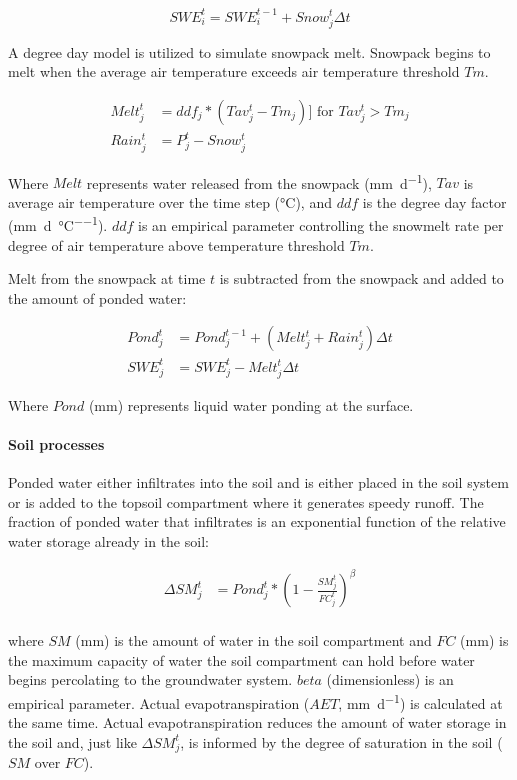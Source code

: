 \begin{equation}
SWE_i^t = SWE_i^{t-1} + Snow_j^t \Delta t
\end{equation}

A degree day model is utilized to simulate snowpack melt. Snowpack begins to melt when the average air temperature exceeds air temperature threshold $Tm$.

\begin{align}
Melt_j^t &= ddf_j * (Tav_j^t - Tm_j)  ]\text{ for } Tav_j^t > Tm_j \\
Rain_j^t &= P_j^t - Snow_j^t     
\end{align}

\noindent Where $Melt$ represents water released from the snowpack (\si{\milli\metre\per\day}), $Tav$ is average air temperature over the time step (\si{\degreeCelsius}), and $ddf$ is the degree day factor (\si{\milli\metre\per\day\per\degreeCelsius}). $ddf$ is an empirical parameter controlling the snowmelt rate per degree of air temperature above temperature threshold $Tm$. 

Melt from the snowpack at time $t$ is subtracted from the snowpack and added to the amount of ponded water:

\begin{align}
Pond_j^t &= Pond_j^{t-1} + (Melt_j^t + Rain_j^t)\Delta t \\
SWE_j^t &= SWE_j^t - Melt_j^t \Delta t   
\end{align}

\noindent Where $Pond$ (\si{\milli\metre}) represents liquid water ponding at the surface.

\paragraph{Soil processes} 

Ponded water either infiltrates into the soil and is either placed in the soil system or is added to the topsoil compartment where it generates speedy runoff. The fraction of ponded water that infiltrates is an exponential function of the relative water storage already in the soil:

\begin{align}
\Delta SM_j^t &= Pond_j^t * \left(1 - \frac{SM_j^t}{FC_j^t} \right)^\beta \\
\end{align}

\noindent where $SM$ (\si{\milli\metre}) is the amount of water in the soil compartment and $FC$ (\si{\milli\metre}) is the maximum capacity of water the soil compartment can hold before water begins percolating to the groundwater system. $beta$ (dimensionless) is an empirical parameter. Actual evapotranspiration ($AET$, \si{\milli\metre\per\day}) is calculated at the same time. Actual evapotranspiration reduces the amount of water storage in the soil and, just like $\Delta SM_j^t$, is informed by the degree of saturation in the soil ($SM$ over $FC$).

